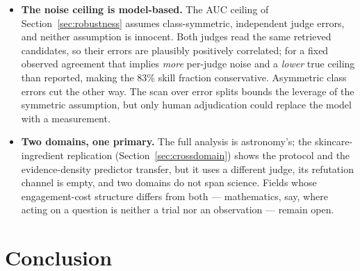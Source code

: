 \documentclass[11pt]{article}
\begin{document}
\begin{itemize}
  \item \textbf{The noise ceiling is model-based.} The AUC ceiling of
    Section~\ref{sec:robustness} assumes class-symmetric, independent
    judge errors, and neither assumption is innocent. Both judges read
    the same retrieved candidates, so their errors are plausibly
    positively correlated; for a fixed observed agreement that implies
    \emph{more} per-judge noise and a \emph{lower} true ceiling than
    reported, making the 83\% skill fraction conservative. Asymmetric
    class errors cut the other way. The scan over error splits bounds
    the leverage of the symmetric assumption, but only human
    adjudication could replace the model with a measurement.
  \item \textbf{Two domains, one primary.} The full analysis is
    astronomy's; the skincare-ingredient replication
    (Section~\ref{sec:crossdomain}) shows the protocol and the
    evidence-density predictor transfer, but it uses a different judge,
    its refutation channel is empty, and two domains do not span
    science. Fields whose engagement-cost structure differs from both
    --- mathematics, say, where acting on a question is neither a trial
    nor an observation --- remain open.
\end{itemize}

\section{Conclusion}
\label{sec:conclusion}
\end{document}
